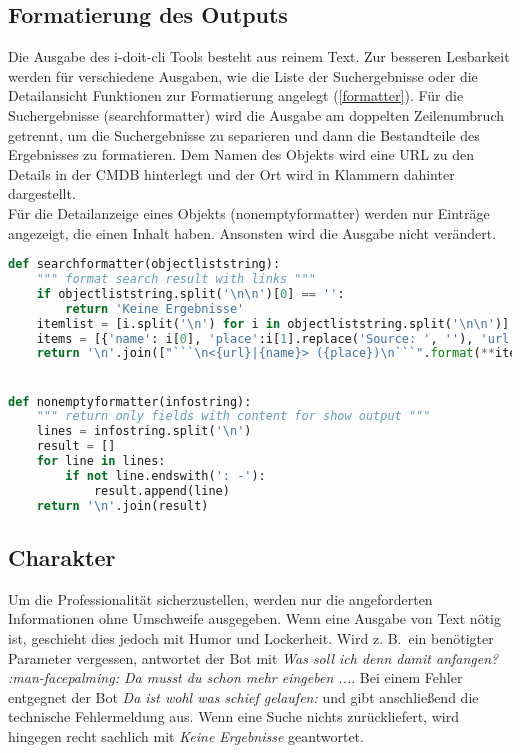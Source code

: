 \subsection{Formatierung des Outputs}
Die Ausgabe des i-doit-cli Tools besteht aus reinem Text. Zur besseren Lesbarkeit werden für verschiedene Ausgaben, wie die Liste der Suchergebnisse oder die Detailansicht Funktionen zur Formatierung angelegt (\autoref{formatter}).
Für die Suchergebnisse (searchformatter) wird die Ausgabe am doppelten Zeilenumbruch getrennt, um die Suchergebnisse zu separieren und dann die Bestandteile des Ergebnisses zu formatieren. Dem Namen des Objekts wird eine URL zu den Details in der \acs{CMDB} hinterlegt und der Ort wird in Klammern dahinter dargestellt.\\
Für die Detailanzeige eines Objekts (nonemptyformatter) werden nur Einträge angezeigt, die einen Inhalt haben. Ansonsten wird die Ausgabe nicht verändert.

\newpage
\begin{lstlisting}[language=python, label=formatter, caption=Funktionen zur Formatierung]
def searchformatter(objectliststring):
    """ format search result with links """
    if objectliststring.split('\n\n')[0] == '':
        return 'Keine Ergebnisse'
    itemlist = [i.split('\n') for i in objectliststring.split('\n\n')]  # get single lines for every search result item
    items = [{'name': i[0], 'place':i[1].replace('Source: ', ''), 'url': i[2].replace('Link: ', '')} for i in itemlist]  # save information to dict and remove description in text
    return '\n'.join(["```\n<{url}|{name}> ({place})\n```".format(**item) for item in items])


def nonemptyformatter(infostring):
    """ return only fields with content for show output """
    lines = infostring.split('\n')
    result = []
    for line in lines:
        if not line.endswith(': -'):
            result.append(line)
    return '\n'.join(result)
\end{lstlisting}


\subsection{Charakter}
Um die Professionalität sicherzustellen, werden nur die angeforderten Informationen ohne Umschweife ausgegeben. Wenn eine Ausgabe von Text nötig ist, geschieht dies jedoch mit Humor und Lockerheit. Wird z. B.~ein benötigter Parameter vergessen, antwortet der Bot mit \textit{Was soll ich denn damit anfangen? :man-facepalming: Da musst du schon mehr eingeben ...}. Bei einem Fehler entgegnet der Bot \textit{Da ist wohl was schief gelaufen:} und gibt anschließend die technische Fehlermeldung aus. Wenn eine Suche nichts zurückliefert, wird hingegen recht sachlich mit \textit{Keine Ergebnisse} geantwortet. 

